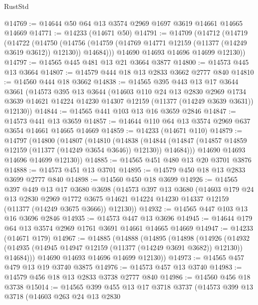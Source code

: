 \begin{lexlean}{RustStd}
\begin{coremodule}
@14769 := @14644 @50 @64 @13 @3574 @2969 @1697 @3619 @14661 @14665 @14669
@14771 := @14233 (@14671 @50)
@14791 := @14709
    (@14712
      (@14719
        (@14722
          (@14750
            (@14756 (@14759 (@14769 @14771 @12159 (@11377 (@14249 @3619 @3612)) @12130)) @14684)))
        @14690
        @14693
        @14696
        @14699
        @12130))
@14797 := @14565 @445 @481 @13 @21 @3664 @3877
@14800 := @14573 @445 @13 @3664
@14807 := @14579 @444 @18 @13 @2833 @3662 @2777 @840
@14810 := @14560 @444 @18 @3662
@14838 := @14565
    @395
    @443
    @13
    @17
    @3644
    @3661
    (@14573
      @395
      @13
      @3644
      (@14603
        @110
        @24
        @13
        @2830
        @2969
        @1734
        @3639
        @14621
        @14224
        @14230
        @14307
        @12159
        (@11377 (@14249 @3639 @3631))
        @12130))
@14844 := @14565 @441 @103 @13 @16 @3659 @2846
@14847 := @14573 @441 @13 @3659
@14857 := @14644 @110 @64 @13 @3574 @2969 @637 @3654 @14661 @14665 @14669
@14859 := @14233 (@14671 @110)
@14879 := @14797
    (@14800
      (@14807
        (@14810
          (@14838
            (@14844 (@14847 (@14857 @14859 @12159 (@11377 (@14249 @3654 @3646)) @12130)) @14684)))
        @14690
        @14693
        @14696
        @14699
        @12130))
@14885 := @14565 @451 @480 @13 @20 @3701 @3876
@14888 := @14573 @451 @13 @3701
@14895 := @14579 @450 @18 @13 @2833 @3699 @2777 @840
@14898 := @14560 @450 @18 @3699
@14926 := @14565
    @397
    @449
    @13
    @17
    @3680
    @3698
    (@14573
      @397
      @13
      @3680
      (@14603
        @179
        @24
        @13
        @2830
        @2969
        @1772
        @3675
        @14621
        @14224
        @14230
        @14337
        @12159
        (@11377 (@14249 @3675 @3666))
        @12130))
@14932 := @14565 @447 @103 @13 @16 @3696 @2846
@14935 := @14573 @447 @13 @3696
@14945 := @14644 @179 @64 @13 @3574 @2969 @1761 @3691 @14661 @14665 @14669
@14947 := @14233 (@14671 @179)
@14967 := @14885
    (@14888
      (@14895
        (@14898
          (@14926
            (@14932 (@14935 (@14945 @14947 @12159 (@11377 (@14249 @3691 @3682)) @12130)) @14684)))
        @14690
        @14693
        @14696
        @14699
        @12130))
@14973 := @14565 @457 @479 @13 @19 @3740 @3875
@14976 := @14573 @457 @13 @3740
@14983 := @14579 @456 @18 @13 @2833 @3738 @2777 @840
@14986 := @14560 @456 @18 @3738
@15014 := @14565
    @399
    @455
    @13
    @17
    @3718
    @3737
    (@14573
      @399
      @13
      @3718
      (@14603
        @263
        @24
        @13
        @2830

\end{coremodule}
\end{lexlean}
